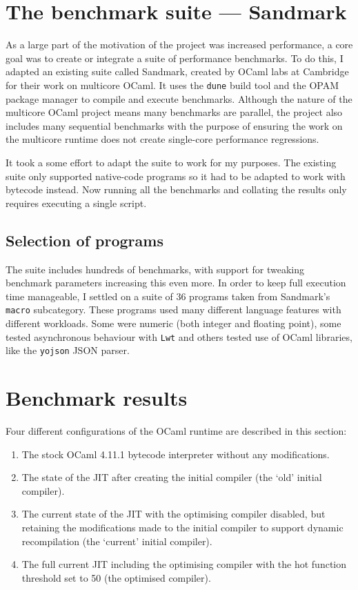 \section{The benchmark suite --- Sandmark}

As a large part of the motivation of the project was increased performance, a core goal was to
create or integrate a suite of performance benchmarks. To do this, I adapted an existing suite
called Sandmark, created by OCaml labs at Cambridge for their work on
multicore OCaml. It uses the \texttt{dune} build tool and the OPAM package manager to compile and
execute benchmarks.
Although the nature of the multicore OCaml project means many benchmarks are parallel, the project
also includes many sequential benchmarks with the purpose of ensuring the work on the multicore
runtime does not create single-core performance regressions.

It took a some effort to adapt the suite to work for my purposes. The existing suite only
supported native-code programs so it had to be adapted to work with bytecode instead. Now running
all the benchmarks and collating the results only requires executing a single script.

\subsection{Selection of programs}

The suite includes hundreds of benchmarks, with support for tweaking benchmark parameters
increasing
this even more. In order to keep full execution time manageable, I settled on a suite of 36
programs taken from Sandmark's \texttt{macro} subcategory. These programs used many different
language features with different workloads. Some were numeric (both integer and floating point),
some tested asynchronous behaviour with \texttt{Lwt} and others tested use of OCaml libraries, like
the \texttt{yojson} JSON parser.

\section{Benchmark results}

Four different configurations of the OCaml runtime are described in this section:

\begin{enumerate}
      \item The stock OCaml 4.11.1 bytecode interpreter without any modifications.
      \item The state of the JIT after creating the initial compiler (the `old' initial compiler).
      \item The current state of the JIT with the optimising compiler disabled, but retaining
            the modifications made to the initial compiler to support dynamic recompilation (the
            `current' initial compiler).
      \item The full current JIT including the optimising compiler with the hot function threshold
            set to 50 (the optimised compiler).
\end{enumerate}

